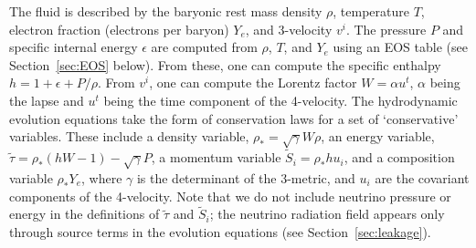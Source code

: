 The fluid is described by the baryonic rest mass density $\rho$, temperature $T$,
electron fraction (electrons per baryon) $Y_e$, and 3-velocity $v^i$.  The
pressure $P$ and specific internal energy $\epsilon$ are computed from
$\rho$, $T$, and $Y_e$ using an EOS table (see
Section~\ref{sec:EOS} below).  From these, one can compute the specific
enthalpy $h=1+\epsilon+P/\rho$.  From $v^i$, one can compute the Lorentz
factor $W=\alpha u^t$, $\alpha$ being the lapse and $u^t$ being the time
component of the 4-velocity.  The hydrodynamic evolution equations take
the form of conservation laws for a set of `conservative' variables.  These
include a density variable, $\rho_*=\sqrt{\gamma}W\rho$, an energy variable,
$\tilde\tau=\rho_*(hW-1)-\sqrt{\gamma}P$, a momentum variable
$\tilde S_i=\rho_*hu_i$, and a composition variable $\rho_*Y_e$, where
$\gamma$ is the determinant of the 3-metric, and $u_i$ are the covariant
components of the 4-velocity.  Note that we do not include neutrino
pressure or energy in the definitions of $\tilde\tau$ and $\tilde S_i$;
the neutrino radiation field appears only through source terms in the
evolution equations (see Section~\ref{sec:leakage}).


